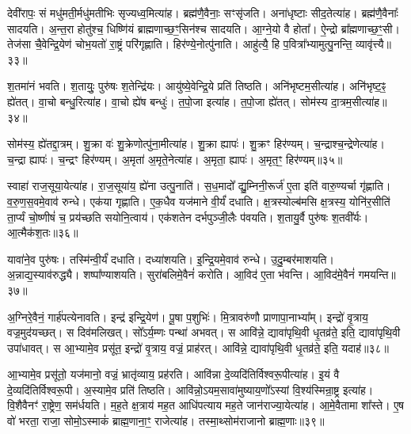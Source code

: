 देवी॑रापः॒ सं मधु॑मती॒र्मधु॑मतीभिः सृज्यध्व॒मित्या॑ह।
ब्रह्म॑णै॒वैनाः॒ सꣳसृ॑जति।
अना॑धृष्टाः सीद॒तेत्या॑ह।
ब्रह्म॑णै॒वैनाः᳚ सादयति।
अ॒न्त॒रा होतु॑श्च॒ धिष्णि॑यं ब्राह्मणाच्छ॒ꣳ॒सिन॑श्च सादयति।
आ॒ग्ने॒यो वै होता᳚।
ऐ॒न्द्रो ब्रा᳚ह्मणाच्छ॒ꣳ॒सी।
तेज॑सा चै॒वेन्द्रि॒येण॑ चोभ॒यतो॑ रा॒ष्ट्रं परि॑गृह्णाति।
हिर॑ण्ये॒नोत्पु॑नाति।
आहु॑त्यै॒ हि प॒वित्रा᳚भ्यामुत्पु॒नन्ति॒ व्यावृ॑त्त्यै॥३३॥

श॒तमा॑नं भवति।
श॒तायुः॒ पुरु॑षः श॒तेन्द्रि॑यः।
आयु॑ष्ये॒वेन्द्रि॒ये प्रति॑ तिष्ठति।
अनि॑भृष्टम॒सीत्या॑ह।
अनि॑भृष्ट॒ꣴ॒ ह्ये॑तत्।
वा॒चो बन्धु॒रित्या॑ह।
वा॒चो ह्ये॑ष बन्धुः॑।
त॒पो॒जा इत्या॑ह।
त॒पो॒जा ह्ये॑तत्।
सोम॑स्य दा॒त्रम॒सीत्या॑ह॥३४॥

सोम॑स्य॒ ह्ये॑तद्दा॒त्रम्।
शु॒क्रा वः॑ शु॒क्रेणोत्पु॑ना॒मीत्या॑ह।
शु॒क्रा ह्यापः॑।
शु॒क्रꣳ हिर॑ण्यम्।
च॒न्द्राश्च॒न्द्रेणेत्या॑ह।
च॒न्द्रा ह्यापः॑।
च॒न्द्रꣳ हिर॑ण्यम्।
अ॒मृता॑ अ॒मृते॒नेत्या॑ह।
अ॒मृता॒ ह्यापः॑।
अ॒मृत॒ꣳ॒ हिर॑ण्यम्॥३५॥

स्वाहा॑ राज॒सूया॒येत्या॑ह।
रा॒ज॒सूया॑य॒ ह्ये॑ना उत्पु॒नाति॑।
स॒ध॒मादो᳚ द्यु॒म्निनी॒रूर्ज॑ ए॒ता इति॑ वारु॒ण्यर्चा गृ॑ह्णाति।
व॒रु॒ण॒स॒वमे॒वाव॑ रुन्धे।
एक॑या गृह्णाति।
ए॒क॒धैव यज॑माने वी॒र्यं॑ दधाति।
क्ष॒त्रस्योल्ब॑मसि क्ष॒त्रस्य॒ योनि॑र॒सीति॑ ता॒र्प्यं चो॒ष्णीषं॑ च॒ प्रय॑च्छति सयोनि॒त्वाय॑।
एक॑शतेन दर्भपुञ्जी॒लैः प॑वयति।
श॒तायु॒र्वै पुरु॑षः श॒तवी᳚र्यः।
आ॒त्मैक॑श॒तः॥३६॥

यावा॑ने॒व पुरु॑षः।
तस्मि॑न्वी॒र्यं॑ दधाति।
दध्या॑शयति।
इ॒न्द्रि॒यमे॒वाव॑ रुन्धे।
उ॒दु॒म्बर॑माशयति।
अ॒न्नाद्य॒स्याव॑रुद्ध्यै।
शष्पा᳚ण्याशयति।
सुरा॑बलिमे॒वैनं॑ करोति।
आ॒विद॑ ए॒ता भ॑वन्ति।
आ॒विद॑मे॒वैनं॑ गमयन्ति॥३७॥

अ॒ग्निरे॒वैनं॒ गार्\mbox{}ह॑पत्येनावति।
इन्द्र॑ इन्द्रि॒येण॑।
पू॒षा प॒शुभिः॑।
मि॒त्रावरु॑णौ प्राणापा॒नाभ्या᳚म्।
इन्द्रो॑ वृ॒त्राय॒ वज्र॒मुद॑यच्छत्।
स दिव॑मलिखत्।
सो᳚ऽर्य॒म्णः पन्था॑ अभवत्।
स आवि॑न्ने॒ द्यावा॑पृथि॒वी धृ॒तव्र॑ते॒ इति॒ द्यावा॑पृथि॒वी उपा॑धावत्।
स आ॒भ्यामे॒व प्रसू॑त॒ इन्द्रो॑ वृ॒त्राय॒ वज्रं॒ प्राह॑रत्।
आवि॑न्ने॒ द्यावा॑पृथि॒वी धृ॒तव्र॑ते॒ इति॒ यदाह॑॥३८॥

आ॒भ्यामे॒व प्रसू॑तो॒ यज॑मानो॒ वज्रं॒ भ्रातृ॑व्याय॒ प्रह॑रति।
आवि॑न्ना दे॒व्यदि॑तिर्विश्वरू॒पीत्या॑ह।
इ॒यं वै दे॒व्यदि॑तिर्विश्व\-रू॒पी।
अ॒स्यामे॒व प्रति॑ तिष्ठति।
आवि॑न्नो॒\-ऽयम॒सावा॑मुष्या\-य॒णो᳚\-ऽस्यां वि॒श्य॑स्मिन्रा॒ष्ट्र इत्या॑ह।
वि॒शैवैनꣳ॑ रा॒ष्ट्रेण॒ सम॑र्धयति।
म॒ह॒ते क्ष॒त्राय॑ मह॒त आधि॑पत्याय मह॒ते जान॑राज्या॒येत्या॑ह।
आ॒\-मे॒वैतामा शा᳚स्ते।
ए॒ष वो॑ भरता॒ राजा॒ सोमो॒\-ऽस्माकं॑ ब्राह्म॒णाना॒ꣳ॒ राजेत्या॑ह।
तस्मा॒थ्सोम॑राजानो ब्राह्म॒णाः॥३९॥

